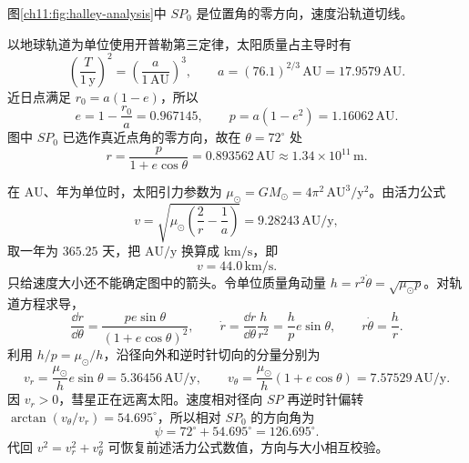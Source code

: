 \begin{xesolution}
图\ref{ch11:fig:halley-analysis}中 $SP_0$ 是位置角的零方向，速度沿轨道切线。
\begin{center}\begin{minipage}{\linewidth}\centering
{}
\label{ch11:fig:halley-analysis}
\end{minipage}\end{center}
以地球轨道为单位使用开普勒第三定律，太阳质量占主导时有
\[
 \left(\frac{T}{1\,\mathrm y}\right)^2
 =\left(\frac{a}{1\,\mathrm{AU}}\right)^3,
 \qquad
 a=(76.1)^{2/3}\,\mathrm{AU}=17.9579\,\mathrm{AU}.
\]
近日点满足 $r_0=a(1-e)$，所以
\[
 e=1-\frac{r_0}{a}=0.967145,
 \qquad
 p=a(1-e^2)=1.16062\,\mathrm{AU}.
\]
图中 $SP_0$ 已选作真近点角的零方向，故在 $\theta=72^\circ$ 处
\[
 \boxed{r=\frac{p}{1+e\cos\theta}=0.893562\,\mathrm{AU}}
 \approx1.34\times10^{11}\,\mathrm m.
\]

在 $\mathrm{AU}$、年为单位时，太阳引力参数为
$\mu_\odot=GM_\odot=4\pi^2\,\mathrm{AU^3/y^2}$。由活力公式
\[
 v=\sqrt{\mu_\odot\left(\frac2r-\frac1a\right)}
   =9.28243\,\mathrm{AU/y},
\]
取一年为 $365.25$ 天，把 $\mathrm{AU/y}$ 换算成 $\mathrm{km/s}$，即
\[
 \boxed{v=44.0\,\mathrm{km/s}}.
\]
只给速度大小还不能确定图中的箭头。令单位质量角动量
$h=r^2\dot\theta=\sqrt{\mu_\odot p}$。对轨道方程求导，
\[
 \frac{\dd r}{\dd\theta}=\frac{pe\sin\theta}{(1+e\cos\theta)^2},\qquad
 \dot r=\frac{\dd r}{\dd\theta}\frac h{r^2}=\frac h p e\sin\theta,\qquad
 r\dot\theta=\frac h r.
\]
利用 $h/p=\mu_\odot/h$，沿径向外和逆时针切向的分量分别为
\[
 v_r=\frac{\mu_\odot}{h}e\sin\theta=5.36456\,\mathrm{AU/y},
 \qquad
 v_\theta=\frac{\mu_\odot}{h}(1+e\cos\theta)=7.57529\,\mathrm{AU/y}.
\]
因 $v_r>0$，彗星正在远离太阳。速度相对径向 $SP$ 再逆时针偏转
$\arctan(v_\theta/v_r)=54.695^\circ$，所以相对 $SP_0$ 的方向角为
\[
 \boxed{\psi=72^\circ+54.695^\circ=126.695^\circ}.
\]
代回 $v^2=v_r^2+v_\theta^2$ 可恢复前述活力公式数值，方向与大小相互校验。
\end{xesolution}

